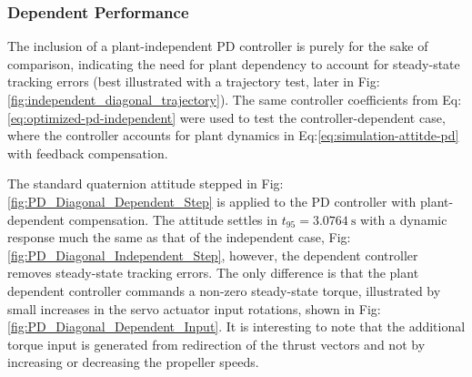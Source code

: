 \subsubsection{Dependent Performance}
\label{subsubsec:simulation.atttiude.pd.dependent}
The inclusion of a plant-independent PD controller is purely for the sake of comparison, indicating the need for plant dependency to account for steady-state tracking errors (best illustrated with a trajectory test, later in Fig:\ref{fig:independent_diagonal_trajectory}). The same controller coefficients from Eq:\ref{eq:optimized-pd-independent} were used to test the controller-dependent case, where the controller accounts for plant dynamics in Eq:\ref{eq:simulation-attitde-pd} with feedback compensation.
\par
The standard quaternion attitude stepped in Fig:\ref{fig:PD_Diagonal_Dependent_Step} is applied to the PD controller with plant-dependent compensation. The attitude settles in $t_{95}=3.0764~\text{s}$ with a dynamic response much the same as that of the independent case, Fig:\ref{fig:PD_Diagonal_Independent_Step}, however, the dependent controller removes steady-state tracking errors. The only difference is that the plant dependent controller commands a non-zero steady-state torque, illustrated by small increases in the servo actuator input rotations, shown in Fig:\ref{fig:PD_Diagonal_Dependent_Input}. It is interesting to note that the additional torque input is generated from redirection of the thrust vectors and not by increasing or decreasing the propeller speeds.
\par
